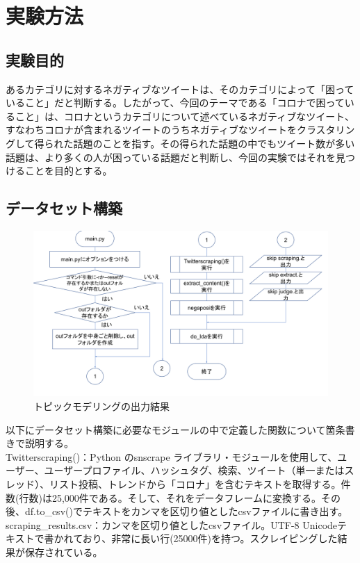 \documentclass[a4paper, 11pt, titlepage]{jsarticle}
\begin{document}
\section{実験方法}
\subsection{実験目的}
あるカテゴリに対するネガティブなツイートは、そのカテゴリによって「困っていること」だと判断する。したがって、今回のテーマである「コロナで困っていること」は、コロナというカテゴリについて述べているネガティブなツイート、すなわちコロナが含まれるツイートのうちネガティブなツイートをクラスタリングして得られた話題のことを指す。その得られた話題の中でもツイート数が多い話題は、より多くの人が困っている話題だと判断し、今回の実験ではそれを見つけることを目的とする。

\subsection{データセット構築}
\begin{figure}[H]
  \centering 
  \includegraphics[scale=0.25]{main_flowchart.png}
  \caption{トピックモデリングの出力結果}
\end{figure}
以下にデータセット構築に必要なモジュールの中で定義した関数について箇条書きで説明する。\\
\noindent
Twitterscraping()：Python のsnscrape ライブラリ・モジュールを使用して、ユーザー、ユーザープロファイル、ハッシュタグ、検索、ツイート（単一またはスレッド）、リスト投稿、トレンドから「コロナ」を含むテキストを取得する。件数(行数)は25,000件である。そして、それをデータフレームに変換する\cite{snscrape1}。その後、df.to\_csv()でテキストをカンマを区切り値としたcsvファイルに書き出す\cite{snscrape2}。\\
scraping\_results.csv：カンマを区切り値としたcsvファイル。UTF-8 Unicodeテキストで書かれており、非常に長い行(25000件)を持つ。スクレイピングした結果が保存されている。\\
\end{document}
